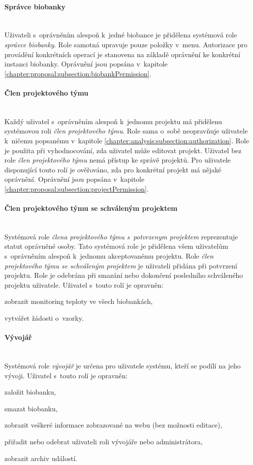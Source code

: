 \documentclass[11pt, draft, oneside]{fithesis2}
\newcommand{\paragraphNewLine}[1]{\paragraph*{#1}\mbox{}\\}
\begin{document}
\paragraphNewLine{Správce biobanky}
Uživateli s~oprávněním alespoň k~jedné biobance je přidělena systémová role \textit{správce biobanky}. Role samotná upravuje pouze položky v~menu. Autorizace pro provádění konkrétních operací je stanovena na základě oprávnění ke konkrétní instanci biobanky. Oprávnění jsou popsána v~kapitole \ref{chapter:proposal:subsection:biobankPermission}.  

\paragraphNewLine{Člen projektového týmu} 
Každý uživatel s~oprávněním alespoň k~jednomu projektu má přidělenu systémovou roli \textit{člen projektového týmu}. Role sama o~sobě neopravňuje uživatele k~ničemu popsanému v~kapitole \ref{chapter:analysis:subsection:authorization}. Role je použita při vyhodnocování, zda uživatel může editovat projekt. Uživatel bez role \textit{člen projektového týmu} nemá přístup ke správě projektů. Pro uživatele disponující touto rolí je ověřováno, zda pro konkrétní projekt má nějaké oprávnění. Oprávnění jsou popsána v~kapitole \ref{chapter:proposal:subsection:projectPermission}.  

\paragraphNewLine{Člen projektového týmu se schváleným projektem}
Systémová role \textit{člena projektového týmu s~potvrzenym projektem} reprezentuje statut oprávněné osoby. Tato systémová role je přidělena všem uživatelům s~oprávněním alespoň k~jednomu akceptovanému projektu. Role \textit{člen projektového týmu se schváleným projektem} je uživateli přidána při potvrzení projektu. Role je odebrána při smazání nebo dokončení posledního schváleného projektu uživatele.
Uživatel s~touto rolí je opravněn:
\begin{compactitem}
	\item zobrazit monitoring teploty ve všech biobankách,
	\item vytvářet žádosti o~vzorky.
\end{compactitem}

\paragraphNewLine{Vývojář}
Systémová role \textit{vývojář} je určena pro uživatele systému, kteří se podílí na jeho vývoji.
Uživatel s~touto rolí je opravněn:
\begin{compactitem}
	\item založit biobanku,
	\item smazat biobanku,
	\item zobrazit veškeré informace zobrazované na webu (bez možnosti editace),
	\item přiřadit nebo odebrat uživateli roli vývojáře nebo administrátora,
	\item zobrazit archiv událostí.
\end{compactitem}
\end{document}
